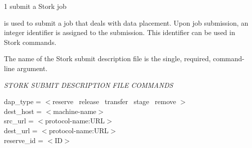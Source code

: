 \begin{ManPage}{\label{man-stork-submit}}{1}
{submit a Stork job}
\Synopsis {}
\ToolArgsBase

\Storkname
{}



\Description 

 is used to submit a job that deals with data placement. 
Upon job submission, an integer identifier is assigned to the
submission.
This identifier can be used in Stork commands.

The name of the Stork submit description file is the single,
required, command-line argument.

\emph{STORK SUBMIT DESCRIPTION FILE COMMANDS}
\begin{description}

\item[dap\_type = $<$reserve \Bar\ release \Bar\ transfer \Bar\ stage \Bar\ remove $>$]

\item[dest\_host = $<$machine-name$>$]

\item[src\_url = $<$protocol-name:URL$>$]

\item[dest\_url = $<$protocol-name:URL$>$]

\item[reserve\_id = $<$ID$>$]


\end{description}
\end{ManPage}
